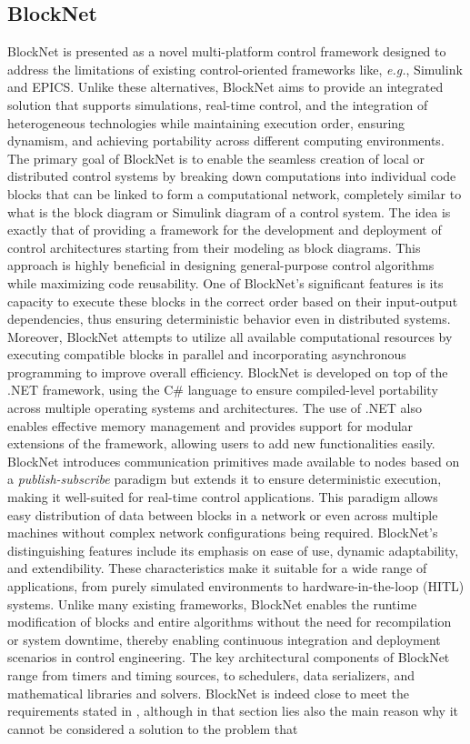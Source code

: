 \subsection{BlockNet}
\label{sec:related_work_blocknet}
BlockNet \cite{calacci_blocknet_2020} is presented as a novel multi-platform control framework designed to address the limitations of existing control-oriented frameworks like, \emph{e.g.}, Simulink and EPICS. Unlike these alternatives, BlockNet aims to provide an integrated solution that supports simulations, real-time control, and the integration of heterogeneous technologies while maintaining execution order, ensuring dynamism, and achieving portability across different computing environments. The primary goal of BlockNet is to enable the seamless creation of local or distributed control systems by breaking down computations into individual code blocks that can be linked to form a computational network, completely similar to what is the block diagram or Simulink diagram of a control system. The idea is exactly that of providing a framework for the development and deployment of control architectures starting from their modeling as block diagrams. This approach is highly beneficial in designing general-purpose control algorithms while maximizing code reusability. One of BlockNet's significant features is its capacity to execute these blocks in the correct order based on their input-output dependencies, thus ensuring deterministic behavior even in distributed systems. Moreover, BlockNet attempts to utilize all available computational resources by executing compatible blocks in parallel and incorporating asynchronous programming to improve overall efficiency. BlockNet is developed on top of the .NET framework, using the C\# language to ensure compiled-level portability across multiple operating systems and architectures. The use of .NET also enables effective memory management and provides support for modular extensions of the framework, allowing users to add new functionalities easily. BlockNet introduces communication primitives made available to nodes based on a \emph{publish-subscribe} paradigm but extends it to ensure deterministic execution, making it well-suited for real-time control applications. This paradigm allows easy distribution of data between blocks in a network or even across multiple machines without complex network configurations being required. BlockNet's distinguishing features include its emphasis on ease of use, dynamic adaptability, and extendibility. These characteristics make it suitable for a wide range of applications, from purely simulated environments to hardware-in-the-loop (HITL) systems. Unlike many existing frameworks, BlockNet enables the runtime modification of blocks and entire algorithms without the need for recompilation or system downtime, thereby enabling continuous integration and deployment scenarios in control engineering. The key architectural components of BlockNet range from timers and timing sources, to schedulers, data serializers, and mathematical libraries and solvers. BlockNet is indeed close to meet the requirements stated in , although in that section lies also the main reason why it cannot be considered a solution to the problem that 
